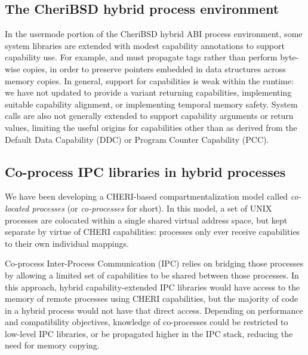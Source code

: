 \documentclass[12pt,twoside,openright,a4paper]{article}
\newcommand{\ccode}[1]{{\small\ttfamily{#1}}}
\newcommand{\note}[2]{{\color{blue}[ Note: #1 - #2]}}
\renewcommand{\note}[2]{\relax\ifhmode\unskip\fi}
\newcommand{\psnote}[1]{\note{#1}{Peter S.}}
\newcommand{\dcnote}[1]{\note{#1}{David}}
\begin{document}
\subsection{The CheriBSD hybrid process environment}

\psnote{Say what this is?}

In the usermode portion of the CheriBSD hybrid ABI process environment,
\psnote{as supported by either the hybrid or pure variants??}
some
system libraries are extended with modest capability annotations to support
capability use.
For example, \ccode{memcpy()} and \ccode{sort()} must propagate tags rather
than perform byte-wise copies, in order to preserve pointers embedded in data
structures across memory copies.
\psnote{Apart from that??}
\psnote{[limited/weak] ?}
In general, support for capabilities is weak within the runtime: we have not
updated \ccode{malloc()} to provide a \ccode{malloc\_c()} variant returning
capabilities, implementing suitable capability alignment, or implementing
temporal memory safety.
\psnote{hard to parse the latter parts of the preceding sentence}
\dcnote{We're also missing a \ccode{mmap} variant for allocating memory outside DDC}
System calls are also not generally extended to support capability arguments
or return values, limiting the useful origins for capabilities other than as
derived from the Default Data Capability (DDC) or Program Counter Capability
(PCC).

\subsection{Co-process IPC libraries in hybrid processes}

\psnote{be clear that this is quite separate to the CheriBSD world??}

We have been developing a CHERI-based compartmentalization model called
\textit{co-located processes} (or \textit{co-processes} for short).
In this model, a set of UNIX processes are colocated within a single shared
virtual address space, but kept separate by virtue of CHERI capabilities:
processes only ever receive capabilities to their own individual mappings.

Co-process Inter-Process Communication (IPC) relies on bridging those
processes by allowing a limited set of capabilities to be shared between those
processes.
In this approach, hybrid capability-extended IPC libraries would have access
to the memory of remote processes using CHERI capabilities, but the majority
of code in a hybrid process would not have that direct access.
Depending on performance and compatibility objectives, knowledge of
co-processes could be restricted to low-level IPC libraries, or be propagated
higher in the IPC stack, reducing the need for memory copying.
\end{document}
